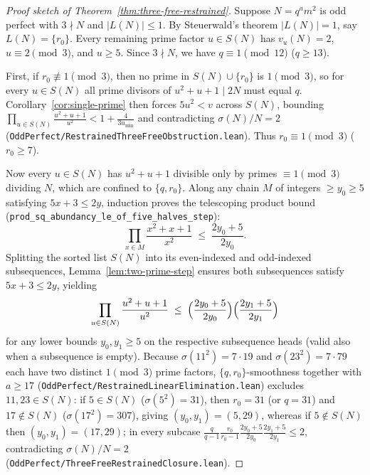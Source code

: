 \documentclass[11pt]{amsart}
\theoremstyle{definition}
\theoremstyle{remark}
\begin{document}
\begin{proof}[Proof sketch of Theorem~\ref{thm:three-free-restrained}]
Suppose $N = q^a m^2$ is odd perfect with $3 \nmid N$ and $|L(N)| \le 1$. By Steuerwald's theorem $|L(N)| = 1$, say $L(N) = \{r_0\}$. Every remaining prime factor $u \in S(N)$ has $v_u(N) = 2$, $u \equiv 2 \pmod 3$, and $u \ge 5$. Since $3 \nmid N$, we have $q \equiv 1 \pmod{12}$ ($q \ge 13$).

First, if $r_0 \not\equiv 1 \pmod 3$, then no prime in $S(N) \cup \{r_0\}$ is $1 \pmod 3$, so for every $u \in S(N)$ all prime divisors of $u^2 + u + 1 \mid 2N$ must equal $q$. Corollary~\ref{cor:single-prime} then forces $5 u^2 < v$ across $S(N)$, bounding $\prod_{u \in S(N)} \frac{u^2 + u + 1}{u^2} < 1 + \frac{4}{3 u_{\min}}$ and contradicting $\sigma(N)/N = 2$ (\texttt{OddPerfect/RestrainedThreeFreeObstruction.lean}). Thus $r_0 \equiv 1 \pmod 3$ ($r_0 \ge 7$).

Now every $u \in S(N)$ has $u^2 + u + 1$ divisible only by primes $\equiv 1 \pmod 3$ dividing $N$, which are confined to $\{q, r_0\}$. Along any chain $M$ of integers $\ge y_0 \ge 5$ satisfying $5 x + 3 \le 2 y$, induction proves the telescoping product bound (\texttt{prod\_sq\_abundancy\_le\_of\_five\_halves\_step}):
\[
  \prod_{x \in M} \frac{x^2 + x + 1}{x^2} \;\le\; \frac{2 y_0 + 5}{2 y_0}.
\]
Splitting the sorted list $S(N)$ into its even-indexed and odd-indexed subsequences, Lemma~\ref{lem:two-prime-step} ensures both subsequences satisfy $5 x + 3 \le 2 y$, yielding
\[
  \prod_{u \in S(N)} \frac{u^2 + u + 1}{u^2} \;\le\; \Bigl(\frac{2 y_0 + 5}{2 y_0}\Bigr) \Bigl(\frac{2 y_1 + 5}{2 y_1}\Bigr)
\]
for any lower bounds $y_0, y_1 \ge 5$ on the respective subsequence heads (valid also when a subsequence is empty). Because $\sigma(11^2) = 7 \cdot 19$ and $\sigma(23^2) = 7 \cdot 79$ each have two distinct $1 \pmod 3$ prime factors, $\{q, r_0\}$-smoothness together with $a \ge 17$ (\texttt{OddPerfect/RestrainedLinearElimination.lean}) excludes $11, 23 \in S(N)$: if $5 \in S(N)$ ($\sigma(5^2) = 31$), then $r_0 = 31$ (or $q = 31$) and $17 \notin S(N)$ ($\sigma(17^2) = 307$), giving $(y_0, y_1) = (5, 29)$, whereas if $5 \notin S(N)$ then $(y_0, y_1) = (17, 29)$; in every subcase $\frac{q}{q - 1}\frac{r_0}{r_0 - 1}\frac{2 y_0 + 5}{2 y_0}\frac{2 y_1 + 5}{2 y_1} \le 2$, contradicting $\sigma(N)/N = 2$ (\texttt{OddPerfect/ThreeFreeRestrainedClosure.lean}).
\end{proof}
\end{document}
